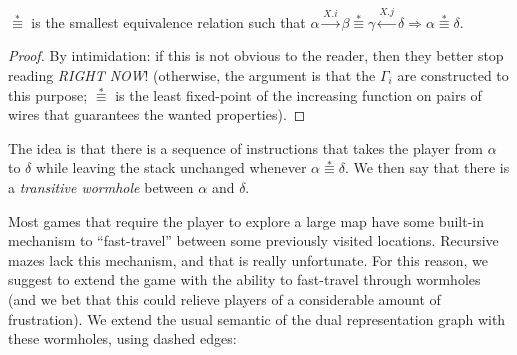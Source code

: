 \documentclass[a4paper,UKenglish,cleveref, autoref]{lipics-v2021}
\begin{document}
\medskip

\begin{lemma}
  $\stackrel{*}{\equiv}$ is the smallest equivalence relation such that
  $\alpha \xrightarrow{X.i} \beta \stackrel{*}{\equiv} \gamma \xleftarrow{X.j}
  \delta \Longrightarrow \alpha \stackrel{*}{\equiv} \delta$.
\end{lemma}
\begin{proof}
  By intimidation: if this is not obvious to the reader, then they better stop
  reading \emph{RIGHT NOW}! (otherwise, the argument is that the $\Gamma_i$ are
  constructed to this purpose; $\stackrel{*}{\equiv}$ is the least fixed-point
  of the increasing function on pairs of wires that guarantees the wanted properties).
\end{proof}

The idea is that there is a sequence of instructions that takes the player from
$\alpha$ to $\delta$ while leaving the stack unchanged whenever
$\alpha \stackrel{*}{\equiv} \delta$. We then say that there is a
\emph{transitive wormhole} between $\alpha$ and $\delta$.

Most games that require the player to explore a large map have some built-in
mechanism to ``fast-travel'' between some previously visited
locations. Recursive mazes lack this mechanism, and that is really
unfortunate. For this reason, we suggest to extend the game with the ability to
fast-travel through wormholes (and we bet that this could relieve players of a
considerable amount of frustration). We extend the usual semantic of the
dual representation graph with these wormholes, using dashed edges:
\end{document}
